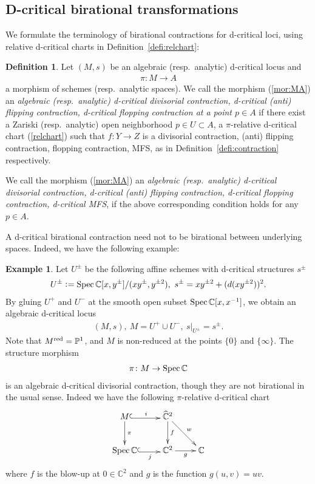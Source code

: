 \documentclass[11pt]{amsart}
\theoremstyle{plain}
\theoremstyle{definition}
\newtheorem{defi}[thm]{Definition}
\newtheorem{exam}[thm]{Example}
\theoremstyle{remark}
\newcommand{\Spec}{\mathop{\rm Spec}\nolimits}
\begin{document}
\subsection{D-critical birational transformations}
We formulate the terminology of 
birational contractions for d-critical loci, using 
relative d-critical charts in Definition~\ref{defi:relchart}: 
\begin{defi}\label{defi:dbir}
Let $(M, s)$ be an algebraic (resp.~analytic)
d-critical locus and 
\begin{align}\label{mor:MA}\pi \colon 
M \to A
\end{align} 
a morphism of schemes (resp.~analytic spaces). 
We
 call the morphism (\ref{mor:MA}) an \textit{algebraic (resp.~analytic)
d-critical divisorial contraction, d-critical 
(anti) flipping contraction, d-critical 
flopping contraction
at a point $p \in A$} if there exist a Zariski (resp.~analytic) open neighborhood 
$p \in U \subset A$, a $\pi$-relative d-critical chart (\ref{relchart})
such that $f \colon Y \to Z$ is a divisorial contraction, 
(anti) flipping contraction, flopping contraction, MFS,
as in Definition~\ref{defi:contraction}
respectively. 

We call the morphism (\ref{mor:MA}) an 
\textit{algebraic (resp.~analytic)
d-critical 
divisorial contraction, d-critical 
(anti) flipping contraction, d-critical 
flopping contraction, d-critical MFS},
if 
the above corresponding 
condition holds for any $p \in A$.
\end{defi}

A d-critical birational contraction need not to be birational between 
underlying spaces. Indeed, we have the following example: 
\begin{exam}\label{exam:dcont}
Let $U^{\pm}$ be the following affine schemes with 
d-critical structures $s^{\pm}$
\begin{align*}
U^{\pm} \cneq \Spec \mathbb{C}[x, y^{\pm}]/(xy^{\pm}, y^{\pm 2}),  \
s^{\pm}=xy^{\pm 2}+(d(xy^{\pm 2}))^2. 
\end{align*}
By gluing 
$U^+$
and $U^-$ at the smooth open subset
 $\Spec \mathbb{C}[x, x^{-1}]$, 
 we obtain an algebraic 
 d-critical locus 
\begin{align*}
(M, s), \ M=U^+ \cup U^-, \ 
s|_{U^{\pm}}=s^{\pm}.
\end{align*}
 Note that $M^{\rm{red}}=\mathbb{P}^1$, and $M$ is non-reduced at 
 the points $\{0\}$ and $\{\infty\}$. 
The structure morphism 
\begin{align*}
\pi \colon M \to \Spec \mathbb{C}
\end{align*}
 is an algebraic 
d-critical divisorial contraction, though they are not birational in the usual sense. 
Indeed we have the following $\pi$-relative d-critical chart
\begin{align}\notag
\xymatrix{
M \ar[d]^-{\pi}
 \ar@<-0.3ex>@{^{(}->}[r]^-{i} & \widehat{\mathbb{C}}^2 \ar[d]^-{f} \ar[rd]^-{w} \\
\Spec \mathbb{C} \ar@<-0.3ex>@{^{(}->}[r]_-{j} & \mathbb{C}^2 \ar[r]_-{g} & \mathbb{C}
}
\end{align}
where $f$ is the blow-up at $0 \in \mathbb{C}^2$
and $g$ is the function $g(u, v)=uv$. 
\end{exam}
\end{document}
